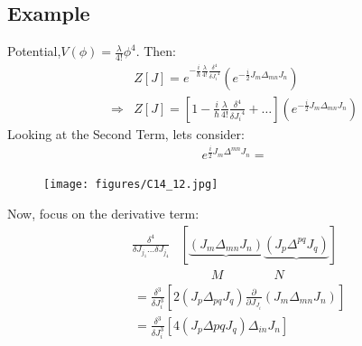 \documentclass[14pt]{article} %
\begin{document}
\subsection*{Example}
Potential,\quad \(V(\phi) = \frac{\lambda}{4!} \phi^4\). Then:
\begin{align*}
&Z[J] = e^{-\frac{i}{\hbar} \frac{\lambda}{4!} 
\frac{\delta^4}{\delta {J_i}^4}}
\left( e^{-\frac{i}{2} J_m \Delta_{mn} J_n} \right) \\
\Rightarrow & Z[J] = \left[ 1 - \frac{i}{\hbar} \frac{\lambda}{4!} 
\frac{\delta^4}{\delta {J_i}^4} + \dots \right]
\left( e^{-\frac{i}{2} J_m \Delta_{mn} J_n} \right)
\end{align*}
Looking at the Second Term, lets consider:
\begin{align*}
e^{\frac{i}{2} J_m \Delta^{mn} J_n} =
\end{align*}
\vspace{-1cm}
\begin{figure}[H]
    \centering
    \texttt{[image: figures/C14\_12.jpg]}
    \caption*{}
    \label{fig:placeholder}
\end{figure}
\vspace{-1cm}



Now, focus on the derivative term:
\begin{align*}
\frac{\delta^4}{\delta J_{j_1} \dots \delta J_{j_4}}
&\left[ \underbrace{(J_m \Delta_{mn} J_n)} \underbrace{(J_p \Delta^{pq} J_q)} \right] \\
& \qquad ~~ M \qquad \qquad N
\end{align*}
\begin{align*}
&=\frac{\delta^3}{\delta J_i ^3}
\left[ 2 (J_p \Delta_{pq} J_q) \frac{\partial}{\partial J_{J_i}}
(J_m \Delta_{mn} J_n) \right]
\\
&= \frac{\delta^3}{\delta J_i ^3}
\left[ 4 (J_p \Delta{pq} J_q) \Delta_{in} J_n \right]
\end{align*}
\end{document}
